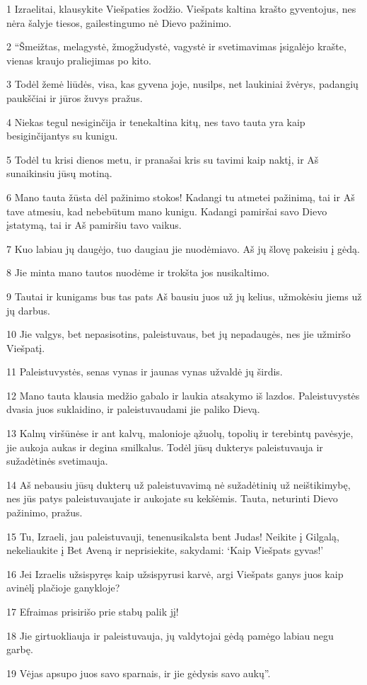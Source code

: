 \par 1 Izraelitai, klausykite Viešpaties žodžio. Viešpats kaltina krašto gyventojus, nes nėra šalyje tiesos, gailestingumo nė Dievo pažinimo. 
\par 2 “Šmeižtas, melagystė, žmogžudystė, vagystė ir svetimavimas įsigalėjo krašte, vienas kraujo praliejimas po kito. 
\par 3 Todėl žemė liūdės, visa, kas gyvena joje, nusilps, net laukiniai žvėrys, padangių paukščiai ir jūros žuvys pražus. 
\par 4 Niekas tegul nesiginčija ir tenekaltina kitų, nes tavo tauta yra kaip besiginčijantys su kunigu. 
\par 5 Todėl tu krisi dienos metu, ir pranašai kris su tavimi kaip naktį, ir Aš sunaikinsiu jūsų motiną. 
\par 6 Mano tauta žūsta dėl pažinimo stokos! Kadangi tu atmetei pažinimą, tai ir Aš tave atmesiu, kad nebebūtum mano kunigu. Kadangi pamiršai savo Dievo įstatymą, tai ir Aš pamiršiu tavo vaikus. 
\par 7 Kuo labiau jų daugėjo, tuo daugiau jie nuodėmiavo. Aš jų šlovę pakeisiu į gėdą. 
\par 8 Jie minta mano tautos nuodėme ir trokšta jos nusikaltimo. 
\par 9 Tautai ir kunigams bus tas pats­ Aš bausiu juos už jų kelius, užmokėsiu jiems už jų darbus. 
\par 10 Jie valgys, bet nepasisotins, paleistuvaus, bet jų nepadaugės, nes jie užmiršo Viešpatį. 
\par 11 Paleistuvystės, senas vynas ir jaunas vynas užvaldė jų širdis. 
\par 12 Mano tauta klausia medžio gabalo ir laukia atsakymo iš lazdos. Paleistuvystės dvasia juos suklaidino, ir paleistuvaudami jie paliko Dievą. 
\par 13 Kalnų viršūnėse ir ant kalvų, malonioje ąžuolų, topolių ir terebintų pavėsyje, jie aukoja aukas ir degina smilkalus. Todėl jūsų dukterys paleistuvauja ir sužadėtinės svetimauja. 
\par 14 Aš nebausiu jūsų dukterų už paleistuvavimą nė sužadėtinių už neištikimybę, nes jūs patys paleistuvaujate ir aukojate su kekšėmis. Tauta, neturinti Dievo pažinimo, pražus. 
\par 15 Tu, Izraeli, jau paleistuvauji, tenenusikalsta bent Judas! Neikite į Gilgalą, nekeliaukite į Bet Aveną ir neprisiekite, sakydami: ‘Kaip Viešpats gyvas!’ 
\par 16 Jei Izraelis užsispyręs kaip užsispyrusi karvė, argi Viešpats ganys juos kaip avinėlį plačioje ganykloje? 
\par 17 Efraimas prisirišo prie stabų­ palik jį! 
\par 18 Jie girtuokliauja ir paleistuvauja, jų valdytojai gėdą pamėgo labiau negu garbę. 
\par 19 Vėjas apsupo juos savo sparnais, ir jie gėdysis savo aukų”.




